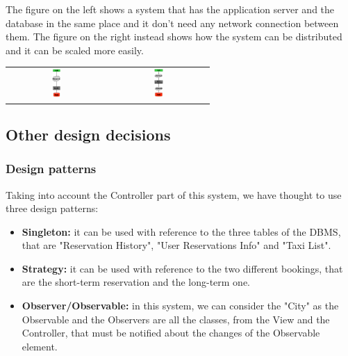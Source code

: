 	The figure on the left shows a system that has the application server and the database in the same place and it don't need any network connection between them. The figure on the right instead shows how the system can be distributed and it can be scaled more easily.
	\begin{center}
	    \begingroup
	    	\setlength{\tabcolsep}{30pt}
		    	\begin{tabular}{ c | c }
			    	\includegraphics[width=0.10\textwidth]{./images/architecture1.png} & 	
			    	\includegraphics[width=0.10\textwidth]{./images/architecture2.png}  \\ 
		    	\end{tabular} 
		\endgroup
	\end{center}	  	
\subsection{Other design decisions}
	\subsubsection{Design patterns}
	Taking into account the Controller part of this system, we have thought to use three design patterns:
		\begin{itemize}
			\item \textbf{Singleton:} it can be used with reference to the three tables of the DBMS, that are "Reservation History", "User Reservations Info" and "Taxi List".
			\item \textbf{Strategy:} it can be used with reference to the two different bookings, that are the short-term reservation and the long-term one.
			\item \textbf{Observer/Observable:} in this system, we can consider the "City" as the Observable and the Observers are all the classes, from the View and the Controller, that must be notified about the changes of the Observable element.
		\end{itemize}
		
		
		
		
		
		
		
		
		
		
		
		
		
		
		
		
		
		
		
		
		
		
		
		
		
		
		
	
	
	
	
	
	